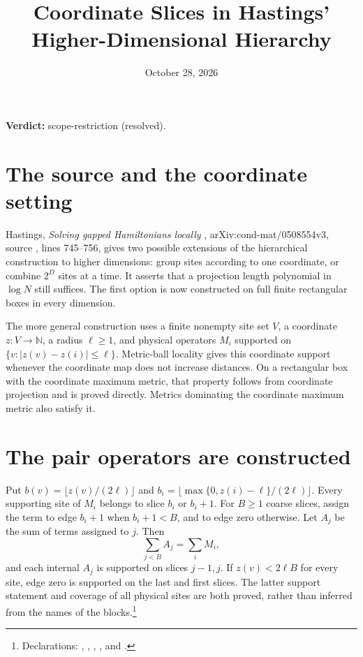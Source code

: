 \documentclass{article}
\title{Coordinate Slices in Hastings' Higher-Dimensional Hierarchy}
\author{}
\date{October 28, 2026}
\providecommand{\gapnote}[2]{\par\noindent\textbf{Verdict:} #1 (#2).\par}
\begin{document}
\maketitle
\gapnote{scope-restriction}{resolved}

\section{The source and the coordinate setting}

Hastings, \emph{Solving gapped Hamiltonians locally}
\cite{Hastings2006Solving}, arXiv:cond-mat/0508554v3, source
, lines 745--756, gives two possible extensions of the
hierarchical construction to higher dimensions: group sites according to
one coordinate, or combine $2^D$ sites at a time. It asserts that a
projection length polynomial in $\log N$ still suffices. The first option
is now constructed on full finite rectangular boxes in every dimension.

The more general construction uses a finite nonempty site set $V$, a
coordinate $z:V\to\mathbb N$, a radius $\ell\ge1$, and physical operators
$M_i$ supported on $\{v:|z(v)-z(i)|\le\ell\}$. Metric-ball locality gives
this coordinate support whenever the coordinate map does not increase
distances. On a rectangular box with the coordinate maximum metric, that
property follows from coordinate projection and is proved directly.
Metrics dominating the coordinate maximum metric also satisfy it.

\section{The pair operators are constructed}

Put $b(v)=\lfloor z(v)/(2\ell)\rfloor$ and
$b_i=\lfloor\max\{0,z(i)-\ell\}/(2\ell)\rfloor$. Every supporting site
of $M_i$ belongs to slice $b_i$ or $b_i+1$. For $B\ge1$ coarse slices,
assign the term to edge $b_i+1$ when $b_i+1<B$, and to edge zero
otherwise. Let $A_j$ be the sum of terms assigned to $j$. Then
\[
 \sum_{j<B}A_j=\sum_iM_i,
\]
and each internal $A_j$ is supported on slices $j-1,j$. If
$z(v)<2\ell B$ for every site, edge zero is supported on the last and
first slices. The latter support statement and coverage of all physical
sites are both proved, rather than inferred from the names of the
blocks.\footnote{Declarations:
,
,
,
, and
.}
\end{document}
